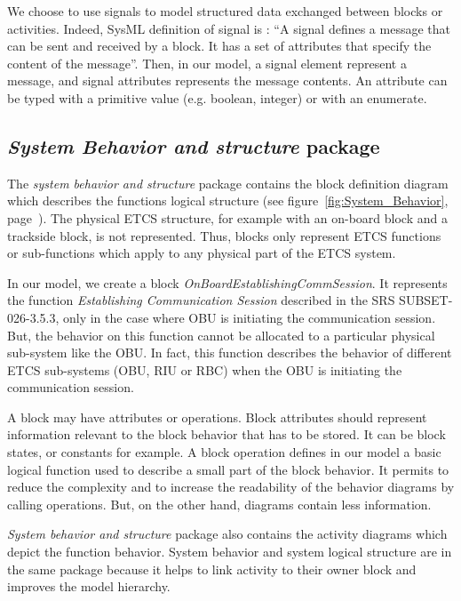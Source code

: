 \documentclass{template/openetcs_report}
\newcommand\refFigure[1]{figure~\ref{#1}, page~\pageref{#1}}
\newcommand\packageName[1]{\emph{#1}}
\begin{document}
We choose to use signals to model structured data exchanged between blocks or activities. Indeed, SysML definition of signal is \cite{SysML_Guide}: ``A signal defines a message that can be sent and received by a block. It has a set of attributes that specify the content of the message''. Then, in our model, a signal element represent a message, and signal attributes represents the message contents. An attribute can be typed with a primitive value (e.g. boolean, integer) or with an enumerate.

\subsection{\packageName{System Behavior and structure} package}

The \packageName{system behavior and structure} package contains the block definition diagram which describes the functions logical structure (see \refFigure{fig:System_Behavior}). The physical ETCS structure, for example with an on-board block and a trackside block, is not represented. Thus, blocks only represent ETCS functions or sub-functions which apply to any physical part of the ETCS system. 

In our model, we create a block \textsl{OnBoardEstablishingCommSession}. It represents the function \textsl{Establishing Communication Session} described in the SRS SUBSET-026-3.5.3, only in the case where OBU is initiating the communication session. But, the behavior on this function cannot be allocated to a particular physical sub-system like the OBU. In fact, this function describes the behavior of different ETCS sub-systems (OBU, RIU or RBC) when the OBU is initiating the communication session. 

A block may have attributes or operations. Block attributes should represent information relevant to the block behavior that has to be stored. It can be block states, or constants for example. A block operation defines in our model a basic logical function used to describe a small part of the block behavior. It permits to reduce the complexity and to increase the readability of the behavior diagrams by calling operations. But, on the other hand, diagrams contain less information.

\packageName{System behavior and structure} package also contains the activity diagrams which depict the function behavior. System behavior and system logical structure are in the same package because it helps to link activity to their owner block and improves the model hierarchy.
\end{document}
